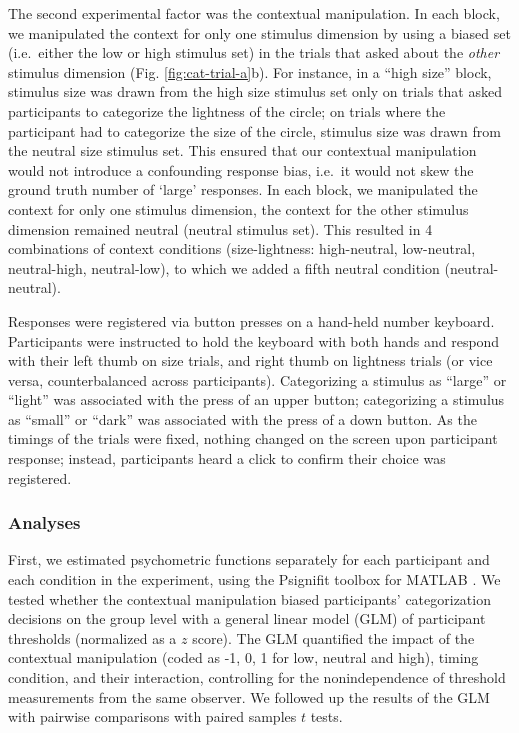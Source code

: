 \documentclass[a4paper, nobind]{templates/ociamthesis}
\begin{document}
The second experimental factor was the contextual manipulation. In each block, we manipulated the context for only one stimulus dimension by using a biased set (i.e.~either the low or high stimulus set) in the trials that asked about the \emph{other} stimulus dimension (Fig. \ref{fig:cat-trial-a}b). For instance, in a ``high size'' block, stimulus size was drawn from the high size stimulus set only on trials that asked participants to categorize the lightness of the circle; on trials where the participant had to categorize the size of the circle, stimulus size was drawn from the neutral size stimulus set. This ensured that our contextual manipulation would not introduce a confounding response bias, i.e.~it would not skew the ground truth number of `large' responses. In each block, we manipulated the context for only one stimulus dimension, the context for the other stimulus dimension remained neutral (neutral stimulus set). This resulted in 4 combinations of context conditions (size-lightness: high-neutral, low-neutral, neutral-high, neutral-low), to which we added a fifth neutral condition (neutral-neutral).

Responses were registered via button presses on a hand-held number keyboard. Participants were instructed to hold the keyboard with both hands and respond with their left thumb on size trials, and right thumb on lightness trials (or vice versa, counterbalanced across participants). Categorizing a stimulus as ``large'' or ``light'' was associated with the press of an upper button; categorizing a stimulus as ``small'' or ``dark'' was associated with the press of a down button. As the timings of the trials were fixed, nothing changed on the screen upon participant response; instead, participants heard a click to confirm their choice was registered.

\hypertarget{analyses-4}{%
\subsubsection{Analyses}\label{analyses-4}}

First, we estimated psychometric functions separately for each participant and each condition in the experiment, using the Psignifit toolbox for MATLAB \autocite{schutt2015}. We tested whether the contextual manipulation biased participants' categorization decisions on the group level with a general linear model (GLM) of participant thresholds (normalized as a \(z\) score). The GLM quantified the impact of the contextual manipulation (coded as -1, 0, 1 for low, neutral and high), timing condition, and their interaction, controlling for the nonindependence of threshold measurements from the same observer. We followed up the results of the GLM with pairwise comparisons with paired samples \(t\) tests.
\end{document}
